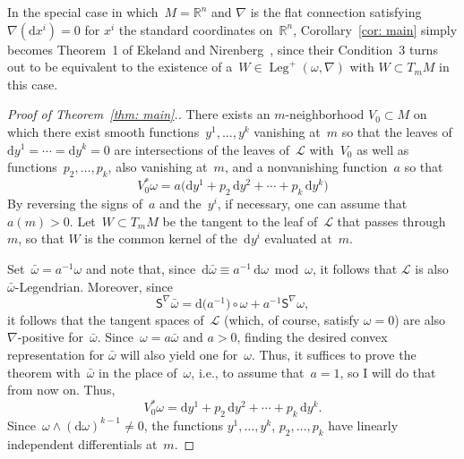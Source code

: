 \documentclass[10pt,a4paper]{amsart}
\renewcommand{\d}{\mathrm{d}}%
\newcommand{\cL}{{\mathcal L}}
\newcommand{\bbR}{{\mathbb R}}
\newcommand{\Leg}{\operatorname{Leg}}
\newcommand{\Ss}{\mathsf{S}}
\newcommand{\w}{\wedge}
\numberwithin{equation}{section}
\begin{document}
\begin{Remark}
In the special case in which~$M=\bbR^n$ and $\nabla$ is the flat
connection satisfying~$\nabla(\d x^i)=0$ for $x^i$ the standard
coordinates on~$\bbR^n$, Corollary~\ref{cor: main}
simply becomes Theorem~1 of Ekeland and Nirenberg~\cite{MR2023129},
since their Condition~3 turns out to be equivalent
to the existence of a~$W\in\Leg^+(\omega,\nabla)$ with $W\subset T_mM$
in this case.
\end{Remark}


\begin{proof}[Proof of Theorem~\ref{thm: main}.]
There exists an $m$-neighborhood $V_0\subset M$
on which there exist smooth functions~$y^1,\ldots,y^k$
vanishing at~$m$
so that the leaves of $\d y^1 =\cdots =\d y^k = 0$
are intersections of the leaves of~$\cL$ with~$V_0$
as well as functions~$p_2,\ldots,p_k$, also vanishing
at~$m$, and a nonvanishing function~$a$ so that
\[
V_0^*\omega
= a\bigl(\d y^1 + p_2\,\d y^2 +\cdots + p_k\,\d y^k\bigr)
\]
By reversing the signs of~$a$ and the~$y^i$,
if necessary, one can assume that~$a(m)>0$.
Let~$W\subset T_mM$ be the tangent to the leaf of~$\cL$
that passes through~$m$, so that $W$ is the common kernel
of the~$\d y^i$ evaluated at~$m$.

Set~$\bar\omega = a^{-1}\omega$ and note that,
since~$\d\bar\omega \equiv a^{-1}\,\d\omega \bmod \omega$,
it follows that $\cL$ is also $\bar\omega$-Legendrian.
Moreover, since
\[
\Ss^\nabla\bar\omega = \d\big(a^{-1}\big)\circ\omega + a^{-1} \Ss^\nabla\omega,
\]
it follows that the tangent spaces of~$\cL$
(which, of course, satisfy $\omega=0$)
are also $\nabla$-positive for~$\bar\omega$.
Since~$\omega = a \bar\omega$ and $a>0$,
finding the desired convex representation for $\bar\omega$
will also yield one for~$\omega$.
Thus, it suffices to prove the theorem with~$\bar\omega$
in the place of~$\omega$, i.e., to assume that~$a=1$,
so I will do that from now on. Thus,
\[
V_0^*\omega = \d y^1 + p_2\,\d y^2 +\cdots + p_k\,\d y^k.
\]
Since~$\omega\w(\d\omega)^{k-1}\not=0$, the functions
$y^1,\ldots,y^k$, $p_2,\ldots,p_k$ have linearly independent differentials
at~$m$.


\end{proof}
\end{document}
